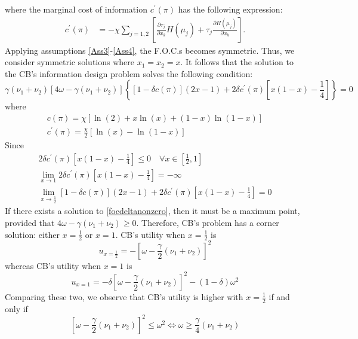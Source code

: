 \documentclass[12pt,a4paper]{article}
\begin{document}
where the marginal cost of information $c^\prime(\pi)$ has the following expression:
\begin{align}
    c^\prime(\pi) & = -\chi \sum_{j=1,2} \left[\frac{\partial \tau_{j}}{\partial x_k}H(\mu_j) + \tau_{j}\frac{\partial H(\mu_j)}{\partial x_k}\right].
\end{align}
Applying assumptions \ref{Ass3}-\ref{Ass4}, the F.O.C.s becomes symmetric. Thus, we consider symmetric solutions where $x_1=x_2=x$.
It follows that the solution to the CB's information design problem solves the following condition:
    \begin{equation}
    \label{focdeltanonzero}
        \gamma(\nu_1+\nu_2)[4\omega-\gamma(\nu_1+\nu_2)]\left\{[1-\delta c(\pi)](2x-1)+2\delta c^\prime(\pi)\left[x(1-x)-\frac{1}{4}\right]\right\}=0
    \end{equation}
    where
    \begin{eqnarray}
        c(\pi)=\chi \left[\ln(2)+x\ln(x)+(1-x)\ln(1-x)\right] \\
        c^\prime(\pi)=\frac{\chi}{2}\left[\ln\left(x\right)-\ln(1-x)\right]
    \end{eqnarray}
    Since
    \begin{eqnarray}
        2\delta c^\prime(\pi)\left[x(1-x)-\frac{1}{4}\right]\leq 0 \quad \forall x\in\left[\frac{1}{2},1\right] \\
        \lim_{x\to 1}2\delta c^\prime(\pi)\left[x(1-x)-\frac{1}{4}\right]=-\infty \\
        \lim_{x\to\frac{1}{2}}[1-\delta c(\pi)](2x-1)+2\delta c^\prime(\pi)\left[x(1-x)-\frac{1}{4}\right]=0
    \end{eqnarray}
    If there exists a solution to \eqref{focdeltanonzero}, then it must be a maximum point, provided that $4\omega-\gamma(\nu_1+\nu_2)\geq0$. Therefore, CB's problem has a corner solution: either $x=\frac{1}{2}$ or $x=1$. CB's utility when $x=\frac{1}{2}$ is
    \begin{equation}
        u_{x=\frac{1}{2}}=-\left[\omega-\frac{\gamma}{2}(\nu_1+\nu_2)\right]^2
    \end{equation}
    whereas CB's utility when $x=1$ is
    \begin{equation}
        u_{x=1}=-\delta\left[\omega-\frac{\gamma}{2}(\nu_1+\nu_2)\right]^2-(1-\delta)\omega^2
    \end{equation}
Comparing these two, we observe that CB's utility is higher with $x=\frac{1}{2}$ if and only if
\begin{equation}
\label{constraintomega}
    \left[\omega-\frac{\gamma}{2}(\nu_1+\nu_2)\right]^2\leq \omega^2 \iff \omega\geq \frac{\gamma}{4}(\nu_1+\nu_2)
\end{equation}
\end{document}
